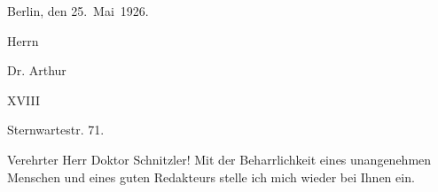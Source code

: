 \pstart
           \raggedleft{}Berlin, den
                  25. Mai 1926.\pend
           
\pstart
           \raggedleft{}Herrn\pend
           
\pstart
           \raggedleft{}Dr. Arthur \pend
           
\pstart
           \raggedleft{} XVIII\pend
           
\pstart
           \raggedleft{}Sternwartestr. 71.\pend
           
\pstart\center{}Verehrter Herr Doktor Schnitzler!\pend\vspace{0.5em}
\pstart
           Mit der Beharrlichkeit eines unangenehmen Menschen und eines guten Redakteurs stelle
               ich mich wieder bei Ihnen ein.\pend
           
